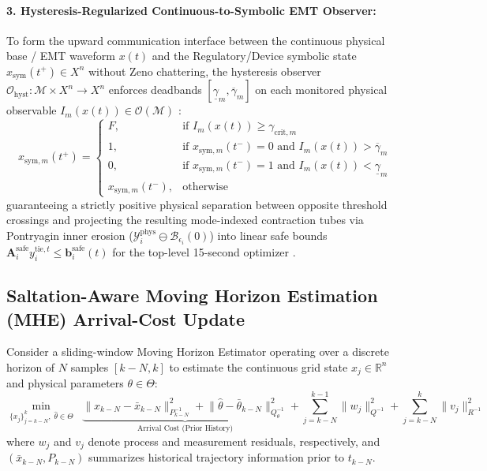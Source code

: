 \documentclass[11pt]{article}
\begin{document}
\paragraph{3. Hysteresis-Regularized Continuous-to-Symbolic EMT Observer:}
To form the upward communication interface between the continuous physical base / EMT waveform $x(t)$ and the Regulatory/Device symbolic state $x_{\mathrm{sym}}(t^+) \in X^n$ without Zeno chattering, the hysteresis observer $\mathcal{O}_{\mathrm{hyst}} : \mathcal{M} \times X^n \to X^n$ enforces deadbands $[\underline{\gamma}_m, \overline{\gamma}_m]$ on each monitored physical observable $I_m(x(t)) \in \mathcal{O}(\mathcal{M})$ \cite{Nestruev2003}:
\begin{equation}
x_{\mathrm{sym}, m}(t^+) =
\begin{cases}
F, & \text{if } I_m(x(t)) \ge \gamma_{\mathrm{crit}, m} \\
1, & \text{if } x_{\mathrm{sym}, m}(t^-) = 0 \text{ and } I_m(x(t)) > \overline{\gamma}_m \\
0, & \text{if } x_{\mathrm{sym}, m}(t^-) = 1 \text{ and } I_m(x(t)) < \underline{\gamma}_m \\
x_{\mathrm{sym}, m}(t^-), & \text{otherwise}
\end{cases}
\end{equation}
guaranteeing a strictly positive physical separation between opposite threshold crossings and projecting the resulting mode-indexed contraction tubes via Pontryagin inner erosion ($\mathcal{Y}_i^{\mathrm{phys}} \ominus \mathcal{B}_{\epsilon_i}(0)$) \cite{Pappas2000, GirardPappas2009} into linear safe bounds $\mathbf{A}_i^{\mathrm{safe}} y_i^{\mathrm{tie}, t} \le \mathbf{b}_i^{\mathrm{safe}}(t)$ for the top-level 15-second optimizer \cite{Sherman2026}.

\subsection{Saltation-Aware Moving Horizon Estimation (MHE) Arrival-Cost Update}

Consider a sliding-window Moving Horizon Estimator operating over a discrete horizon of $N$ samples $[k-N, k]$ to estimate the continuous grid state $x_j \in \mathbb{R}^{n}$ and physical parameters $\theta \in \Theta$:
\begin{equation}
\min_{\{x_j\}_{j=k-N}^{k},\; \hat{\theta} \in \Theta} \;\; \underbrace{\big\| x_{k-N} - \bar{x}_{k-N} \big\|_{P_{k-N}^{-1}}^{2} + \big\| \hat{\theta} - \bar{\theta}_{k-N} \big\|_{Q_{\theta}^{-1}}^{2}}_{\text{Arrival Cost (Prior History)}} + \sum_{j=k-N}^{k-1} \| w_j \|_{Q^{-1}}^{2} + \sum_{j=k-N}^{k} \| v_j \|_{R^{-1}}^{2}
\end{equation}
where $w_j$ and $v_j$ denote process and measurement residuals, respectively, and $(\bar{x}_{k-N}, P_{k-N})$ summarizes historical trajectory information prior to $t_{k-N}$.
\end{document}
